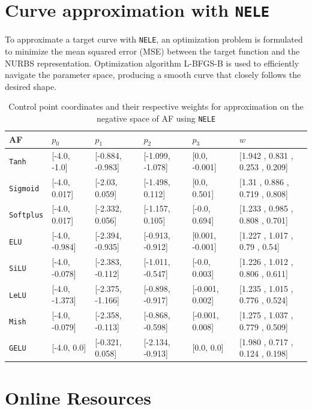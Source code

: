 \documentclass[manuscript, screen, review]{jair}
\begin{document}
\section{Curve approximation with \texttt{NELE}\label{app:nurbsparams}}
To approximate a target curve with \texttt{NELE}, an optimization problem is formulated to minimize the mean squared error (MSE) between the target function and the NURBS representation.
Optimization algorithm L-BFGS-B \cite{scipy_optimize_minimize} is used to efficiently navigate the parameter space, 
producing a smooth curve that closely follows the desired shape.
\begin{table}[H]
  \caption{Control point coordinates and their respective weights for approximation on the negative space of AF using \texttt{NELE}}
  \label{tab:curveapprox}
  \begin{tabular}{@{}llllll@{}}
    \toprule
    AF&$p_0$&$p_1$&$p_2$&$p_3$&$w$\\
    \midrule
    \texttt{Tanh} & [-4.0, -1.0] &    [-0.884, -0.983] &    [-1.099, -1.078] &    [0.0, -0.001] &    [1.942 , 0.831 , 0.253 , 0.209]\\
    \texttt{Sigmoid} & [-4.0, 0.017] &    [-2.03, 0.059] &    [-1.498, 0.112] &    [0.0, 0.501] &    [1.31 , 0.886 , 0.719 , 0.808]\\
    \texttt{Softplus} & [-4.0, 0.017] &    [-2.332, 0.056] &    [-1.157, 0.105] &    [-0.0, 0.694] &    [1.233 , 0.985 , 0.808 , 0.701]\\
    \texttt{ELU} & [-4.0, -0.984] &    [-2.394, -0.935] &    [-0.913, -0.912] &    [0.001, -0.001] &    [1.227 , 1.017 , 0.79 , 0.54]\\
    \texttt{SiLU} & [-4.0, -0.078] &    [-2.383, -0.112] &    [-1.011, -0.547] &    [-0.0, 0.003] &    [1.226 , 1.012 , 0.806 , 0.611]\\
    \texttt{LeLU} & [-4.0, -1.373] &    [-2.375, -1.166] &    [-0.898, -0.917] &    [-0.001, 0.002] &    [1.235 , 1.015 , 0.776 , 0.524]\\
    \texttt{Mish} & [-4.0, -0.079] &    [-2.358, -0.113] &    [-0.868, -0.598] &    [-0.001, 0.008] &    [1.275 , 1.037 , 0.779 , 0.509]\\
    \texttt{GELU} & [-4.0, 0.0] &    [-0.321, 0.058] &    [-2.134, -0.913] &    [0.0, 0.0] &    [1.980 , 0.717 , 0.124 , 0.198]\\
  \bottomrule
\end{tabular}
\end{table}

\section{Online Resources}
\end{document}
